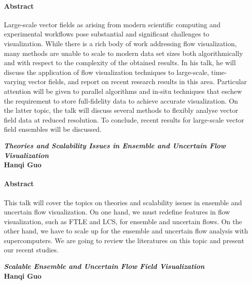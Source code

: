 \documentclass[preprint,journal]{vgtc}       %
\newcommand{\addverticalspace}{\vspace{3mm}}
\begin{document}
\paragraph{Abstract}
Large-scale vector fields as arising from modern scientific computing and experimental workflows pose substantial and significant challenges to visualization. While there is a rich body of work addressing flow visualization, many methods are unable to scale to modern data set sizes both algorithmically and with respect to the complexity of the obtained results. In his talk, he will discuss the application of flow visualization techniques to large-scale, time-varying vector fields, and report on recent research results in this area. Particular attention will be given to parallel algorithms and in-situ techniques that eschew the requirement to store full-fidelity data to achieve accurate visualization. On the latter topic, the talk will discuss several methods to flexibly analyse vector field data at reduced resolution. To conclude, recent results for large-scale vector field ensembles will be discussed.

\addverticalspace

\noindent\textbf{\textit{Theories and Scalability Issues in Ensemble and Uncertain Flow Visualization}}\\
\textbf{Hanqi Guo}
\paragraph{Abstract}
This talk will cover the topics on theories and scalability issues in ensemble and uncertain flow visualization. On one hand, we must redefine features in flow visualization, such as FTLE and LCS, for ensemble and uncertain flows. On the other hand, we have to scale up for the ensemble and uncertain flow analysis with supercomputers. We are going to review the literatures on this topic and present our recent studies.


\noindent\textbf{\textit{Scalable Ensemble and Uncertain Flow Field Visualization}}\\
\textbf{Hanqi Guo}
\end{document}
